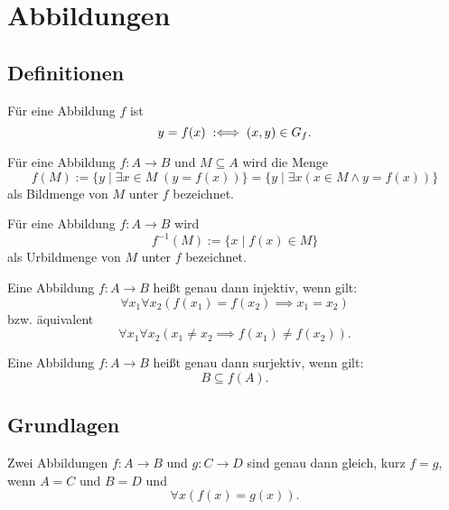 \newpage
\section{Abbildungen}
\subsection{Definitionen}

\begin{Definition}\label{def:app}
Für eine Abbildung $f$ ist
\[y=f(x)\;:\Longleftrightarrow\; (x,y)\in G_f.\]
\end{Definition}

\begin{Definition}\label{def:img}
Für eine Abbildung $f\colon A\to B$ und $M\subseteq A$
wird die Menge
\[f(M) := \{y\mid \exists x{\in}M\;(y=f(x))\}
= \{y\mid \exists x(x\in M\land y=f(x))\}\]
als Bildmenge von $M$ unter $f$ bezeichnet.
\end{Definition}

\begin{Definition}\label{def:preimg}
Für eine Abbildung $f\colon A\to B$ wird
\[f^{-1}(M) := \{x\mid f(x)\in M\}\]
als Urbildmenge von $M$ unter $f$ bezeichnet.
\end{Definition}

\begin{Definition}\label{def:inj}
Eine Abbildung $f\colon A\to B$ heißt genau dann injektiv, wenn gilt:
\[\forall x_1\forall x_2(f(x_1)=f(x_2)\implies x_1=x_2)\]
bzw. äquivalent
\[\forall x_1\forall x_2(x_1\ne x_2\implies f(x_1)\ne f(x_2)).\]
\end{Definition}

\begin{Definition}\label{def:sur}
Eine Abbildung $f\colon A\to B$ heißt genau dann surjektiv, wenn gilt:
\[B\subseteq f(A).\]
\end{Definition}


\subsection{Grundlagen}
\begin{Satz}%
\label{feq}
Zwei Abbildungen $f\colon A\to B$ und $g\colon C\to D$ sind genau
dann gleich, kurz $f=g$, wenn $A=C$ und $B=D$ und
\[\forall x(f(x)=g(x)).\]
\end{Satz}

